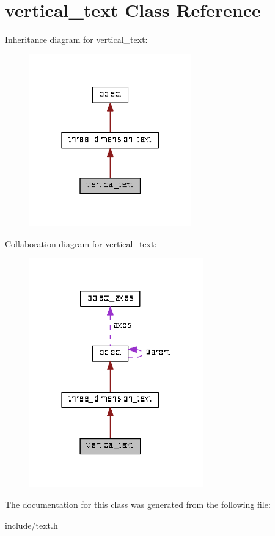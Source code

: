 \hypertarget{classvertical__text}{}\section{vertical\+\_\+text Class Reference}
\label{classvertical__text}


Inheritance diagram for vertical\+\_\+text\+:
\nopagebreak
\begin{figure}[H]
\begin{center}
\leavevmode
\includegraphics[width=199pt]{classvertical__text__inherit__graph}
\end{center}
\end{figure}


Collaboration diagram for vertical\+\_\+text\+:
\nopagebreak
\begin{figure}[H]
\begin{center}
\leavevmode
\includegraphics[width=214pt]{classvertical__text__coll__graph}
\end{center}
\end{figure}


The documentation for this class was generated from the following file\+:\begin{DoxyCompactItemize}
\item 
include/text.\+h\end{DoxyCompactItemize}
